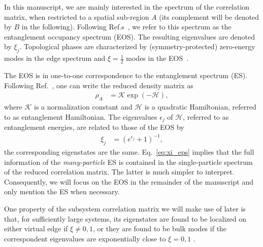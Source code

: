 \documentclass[twocolumn,amsmath,longbibliography,amssymb,superscriptaddress]{revtex4-1}
\begin{document}
In this manuscript, we are mainly interested in the spectrum of the correlation matrix, when restricted to a spatial sub-region $A$ (its complement will be denoted by $B$ in the following). 
Following Ref.s~\cite{Huang2012,Huang2012-2}, we refer to this spectrum as the entanglement occupancy spectrum (EOS). 
The resulting eigenvalues  are denoted by $\xi_j$. 
Topological phases are characterized by (symmetry-protected) zero-energy modes in the edge spectrum and $\xi=\frac 1 2$ modes in the EOS~\cite{Fidkowski2010entanglement}.
 

The EOS is in one-to-one correspondence to the entanglement spectrum (ES). 
Following Ref.~\cite{Peschel2003}, one can write the  reduced density matrix as 
\begin{align}\label{eq:red_dens_mat}
\rho_A&=\mathcal{K} \exp(-\mathcal H),
\end{align}
where $\mathcal{K}$ is a normalization constant and $\mathcal{H}$ is a quadratic Hamiltonian, referred to as entanglement Hamiltonian. 
The eigenvalues $\epsilon_j$ of $\mathcal{H}$, referred to as entanglement energies,  are related to those of the EOS by 
\begin{align}\label{eq:xi_eps}
\xi_j &=\left(e^{\epsilon_j}+1\right)^{-1}, 
\end{align}
the corresponding eigenstates are the same. 
Eq.~\eqref{eq:xi_eps} implies that the full information of the \emph{many-particle} ES is contained in the single-particle spectrum of the reduced correlation matrix. 
The latter is much simpler to interpret. 
Consequently, we will focus on the EOS in the remainder of the manuscript and only mention the ES when necessary. 

One property of the subsystem correlation matrix we will make use of later is that, for sufficiently large systems, its eigenstates are found to be localized on either virtual edge if $\xi \neq 0,1$, or they are found to be bulk modes if the correspondent eigenvalues are exponentially close to $\xi = 0,1$ \cite{Peschel2008}.
\end{document}
